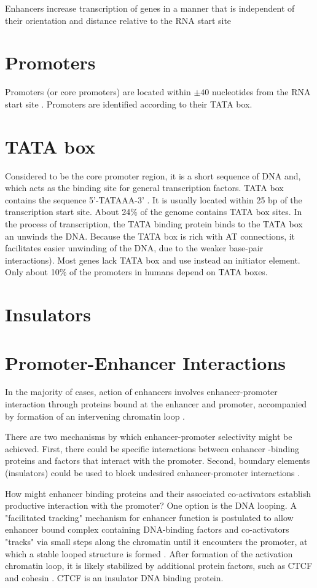 \documentclass[12pt]{paper}
\begin{document}
Enhancers increase transcription of genes in a manner that is independent of their orientation and distance relative to the RNA start site \cite{Blackwood98} 


\section{Promoters}
Promoters (or core promoters) are located within $\pm 40$ nucleotides from the RNA start site \cite{Blackwood98}. Promoters are identified according to their TATA box. 


\section{TATA box}
Considered to be the core promoter region, it is a short sequence of DNA and, which acts as the binding site for general transcription factors. TATA box contains the sequence 5'-TATAAA-3' . It is usually located within 25 bp of the transcription start site. About 24$\%$ of the genome contains TATA box sites. In the process of transcription, the TATA binding protein binds to the TATA box an unwinds the DNA. Because the TATA box is rich with AT connections, it facilitates easier unwinding of the DNA, due to the weaker base-pair interactions). Most genes lack TATA box and use instead an initiator element. Only about 10$\%$ of the promoters in humans depend on TATA boxes. 

\section{Insulators}

\section{Promoter-Enhancer Interactions}
In the majority of cases, action of enhancers involves enhancer-promoter interaction through proteins bound at the enhancer and promoter, accompanied by formation of an intervening chromatin loop \cite{Kulaeva12}.

There are two mechanisms by which enhancer-promoter  selectivity might be achieved. First, there could be specific interactions between enhancer -binding proteins and factors that interact with the promoter. Second, boundary elements (insulators) could be used to block undesired enhancer-promoter interactions \cite{Blackwood98}. 

How might enhancer binding proteins and their associated co-activators  establish productive interaction with the promoter? One option is the DNA looping. A "facilitated tracking" mechanism for enhancer function is postulated to allow enhancer bound complex containing DNA-binding factors and co-activators "tracks" via small steps along the chromatin until it encounters the promoter, at which a stable looped structure is formed \cite{Blackwood98}. After formation of the activation chromatin loop, it is likely stabilized by additional protein factors, such as CTCF and cohesin \cite{Kulaeva12}. CTCF is an insulator DNA binding protein. 
\end{document}
